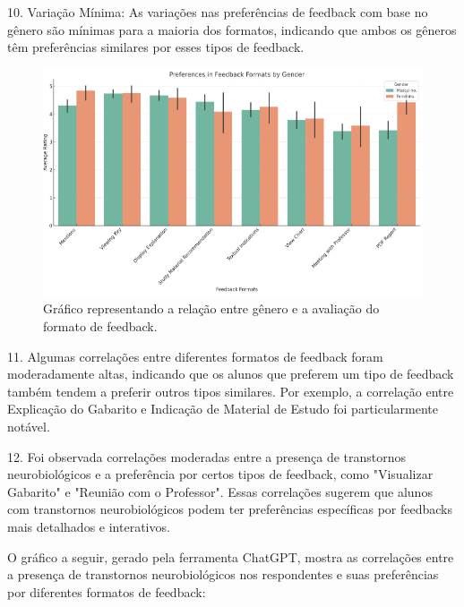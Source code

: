10. Variação Mínima: As variações nas preferências de feedback com base no gênero são mínimas para a maioria dos formatos, indicando que ambos os gêneros têm preferências similares por esses tipos de feedback.

\begin{figure}[H]
\centering
\includegraphics{figuras/gender_graph.png}
\caption{Gráfico representando a relação entre gênero e a avaliação do formato de feedback.}
\end{figure}

11. Algumas correlações entre diferentes formatos de feedback foram moderadamente altas, indicando que os alunos que preferem um tipo de feedback também tendem a preferir outros tipos similares. Por exemplo, a correlação entre Explicação do Gabarito e Indicação de Material de Estudo foi particularmente notável.

12. Foi observada correlações moderadas entre a presença de transtornos neurobiológicos e a preferência por certos tipos de feedback, como "Visualizar Gabarito" e "Reunião com o Professor". Essas correlações sugerem que alunos com transtornos neurobiológicos podem ter preferências específicas por feedbacks mais detalhados e interativos.

O gráfico a seguir, gerado pela ferramenta ChatGPT, mostra as correlações entre a presença de transtornos neurobiológicos nos respondentes e suas preferências por diferentes formatos de feedback:

